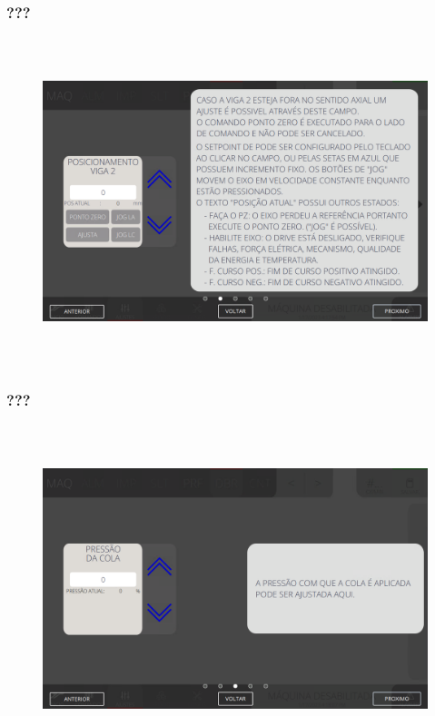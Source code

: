 \newpage
\thispagestyle{fancy}
\vspace*{\fill}
\subsubsection{\small{???}}
\begin{figure}[h]
  \centering
  \includegraphics[width=576px,height=360px]{src/imagesFlexo/07-fold/settings/e-2.png}
   \label{}
\end{figure}
\vspace*{\fill}

\newpage
\thispagestyle{fancy}
\vspace*{\fill}
\subsubsection{\small{???}}
\begin{figure}[h]
  \centering
  \includegraphics[width=576px,height=360px]{src/imagesFlexo/07-fold/settings/e-3.png}
   \label{}
\end{figure}
\vspace*{\fill}

